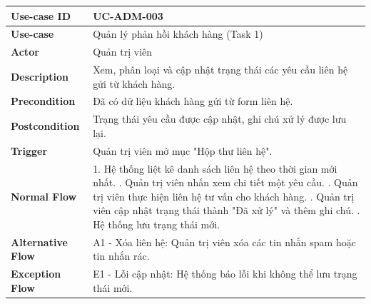 \begin{table}[H]
\centering
\renewcommand{\arraystretch}{1.2}
\begin{tabular}{|p{3.5cm}|p{9.5cm}|}
\hline
\textbf{Use-case ID} & UC-ADM-003 \\ \hline
\textbf{Use-case} & Quản lý phản hồi khách hàng (Task 1) \\ \hline
\textbf{Actor} & Quản trị viên \\ \hline
\textbf{Description} & Xem, phân loại và cập nhật trạng thái các yêu cầu liên hệ gửi từ khách hàng. \\ \hline
\textbf{Precondition} & Đã có dữ liệu khách hàng gửi từ form liên hệ. \\ \hline
\textbf{Postcondition} & Trạng thái yêu cầu được cập nhật, ghi chú xử lý được lưu lại. \\ \hline
\textbf{Trigger} & Quản trị viên mở mục "Hộp thư liên hệ". \\ \hline
\textbf{Normal Flow} & 
1. Hệ thống liệt kê danh sách liên hệ theo thời gian mới nhất. \newline
2. Quản trị viên nhấn xem chi tiết một yêu cầu. \newline
3. Quản trị viên thực hiện liên hệ tư vấn cho khách hàng. \newline
4. Quản trị viên cập nhật trạng thái thành "Đã xử lý" và thêm ghi chú. \newline
5. Hệ thống lưu trạng thái mới. \\ \hline
\textbf{Alternative Flow} & A1 - Xóa liên hệ: Quản trị viên xóa các tin nhắn spam hoặc tin nhắn rác. \\ \hline
\textbf{Exception Flow} & E1 - Lỗi cập nhật: Hệ thống báo lỗi khi không thể lưu trạng thái mới. \\ \hline
\end{tabular}
\end{table}

